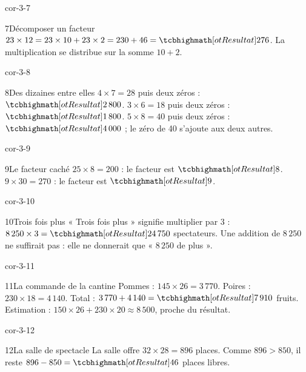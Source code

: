 \begin{blocLivre}{cor-3-7}\begin{corrige}{7}{Décomposer un facteur}
$23\times12=23\times10+23\times2=230+46=\res{276}$. La multiplication se distribue sur la somme $10+2$.
\end{corrige}\end{blocLivre}
\begin{blocLivre}{cor-3-8}\begin{corrige}{8}{Des dizaines entre elles}
$4\times7=28$ puis deux zéros : $\res{2\,800}$. $3\times6=18$ puis deux zéros : $\res{1\,800}$. $5\times8=40$ puis deux zéros : $\res{4\,000}$ ; le zéro de 40 s’ajoute aux deux autres.
\end{corrige}\end{blocLivre}
\begin{blocLivre}{cor-3-9}\begin{corrige}{9}{Le facteur caché}
$25\times8=200$ : le facteur est $\res8$. $9\times30=270$ : le facteur est $\res9$.
\end{corrige}\end{blocLivre}
\begin{blocLivre}{cor-3-10}\begin{corrige}{10}{Trois fois plus}
« Trois fois plus » signifie multiplier par 3 : $8\,250\times3=\res{24\,750}$ spectateurs. Une addition de $8\,250$ ne suffirait pas : elle ne donnerait que « $8\,250$ de plus ».
\end{corrige}\end{blocLivre}
\begin{blocLivre}{cor-3-11}\begin{corrige}{11}{La commande de la cantine}
Pommes : $145\times26=3\,770$. Poires : $230\times18=4\,140$. Total : $3\,770+4\,140=\res{7\,910}$ fruits. Estimation : $150\times26+230\times20\approx8\,500$, proche du résultat.
\end{corrige}\end{blocLivre}
\begin{blocLivre}{cor-3-12}\begin{corrige}{12}{La salle de spectacle}
La salle offre $32\times28=896$ places. Comme $896>850$, il reste $896-850=\res{46}$ places libres.
\end{corrige}\end{blocLivre}
